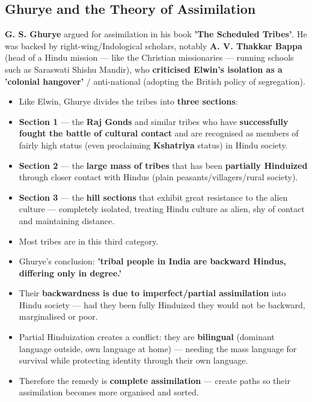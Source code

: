 \subsection{Ghurye and the Theory of Assimilation}

\textbf{G. S. Ghurye} argued for assimilation in his book \textbf{'The Scheduled Tribes'}. He was backed by right-wing/Indological scholars, notably \textbf{A. V. Thakkar Bappa} (head of a Hindu mission --- like the Christian missionaries --- running schools such as Saraswati Shishu Mandir), who \textbf{criticised Elwin's isolation as a 'colonial hangover'} / anti-national (adopting the British policy of segregation).

\begin{KeyConcept}
\begin{itemize}
\item Like Elwin, Ghurye divides the tribes into \textbf{three sections}:
\item \textbf{Section 1} --- the \textbf{Raj Gonds} and similar tribes who have \textbf{successfully fought the battle of cultural contact} and are recognised as members of fairly high status (even proclaiming \textbf{Kshatriya} status) in Hindu society.
\item \textbf{Section 2} --- the \textbf{large mass of tribes} that has been \textbf{partially Hinduized} through closer contact with Hindus (plain peasants/villagers/rural society).
\item \textbf{Section 3} --- the \textbf{hill sections} that exhibit great resistance to the alien culture --- completely isolated, treating Hindu culture as alien, shy of contact and maintaining distance.
\item Most tribes are in this third category.
\end{itemize}
\end{KeyConcept}

\begin{KeyConcept}
\begin{itemize}
\item Ghurye's conclusion: \textbf{'tribal people in India are backward Hindus, differing only in degree.'}
\item Their \textbf{backwardness is due to imperfect/partial assimilation} into Hindu society --- had they been fully Hinduized they would not be backward, marginalised or poor.
\item Partial Hinduization creates a conflict: they are \textbf{bilingual} (dominant language outside, own language at home) --- needing the mass language for survival while protecting identity through their own language.
\item Therefore the remedy is \textbf{complete assimilation} --- create paths so their assimilation becomes more organised and sorted.
\end{itemize}
\end{KeyConcept}

